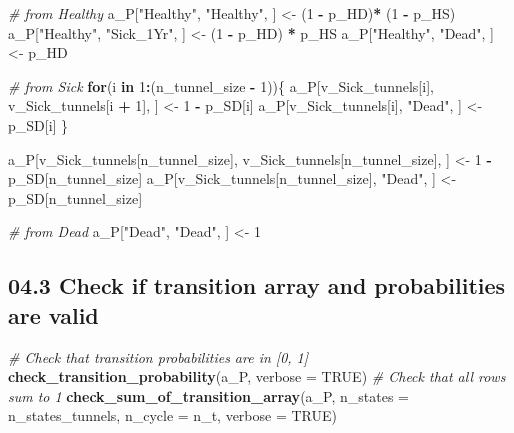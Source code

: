 \documentclass[
]{article}
\newenvironment{Shaded}{\begin{snugshade}}{\end{snugshade}}
\newcommand{\CommentTok}[1]{\textcolor[rgb]{0.56,0.35,0.01}{\textit{#1}}}
\newcommand{\ControlFlowTok}[1]{\textcolor[rgb]{0.13,0.29,0.53}{\textbf{#1}}}
\newcommand{\DataTypeTok}[1]{\textcolor[rgb]{0.13,0.29,0.53}{#1}}
\newcommand{\DecValTok}[1]{\textcolor[rgb]{0.00,0.00,0.81}{#1}}
\newcommand{\KeywordTok}[1]{\textcolor[rgb]{0.13,0.29,0.53}{\textbf{#1}}}
\newcommand{\NormalTok}[1]{#1}
\newcommand{\OperatorTok}[1]{\textcolor[rgb]{0.81,0.36,0.00}{\textbf{#1}}}
\newcommand{\OtherTok}[1]{\textcolor[rgb]{0.56,0.35,0.01}{#1}}
\newcommand{\StringTok}[1]{\textcolor[rgb]{0.31,0.60,0.02}{#1}}
\begin{document}
\begin{Shaded}
\begin{Highlighting}[]
\CommentTok{# from Healthy}
\NormalTok{a_P[}\StringTok{"Healthy"}\NormalTok{, }\StringTok{"Healthy"}\NormalTok{, ]  <-}\StringTok{ }\NormalTok{(}\DecValTok{1} \OperatorTok{-}\StringTok{ }\NormalTok{p_HD)}\OperatorTok{*}\StringTok{ }\NormalTok{(}\DecValTok{1} \OperatorTok{-}\StringTok{ }\NormalTok{p_HS)}
\NormalTok{a_P[}\StringTok{"Healthy"}\NormalTok{, }\StringTok{"Sick_1Yr"}\NormalTok{, ] <-}\StringTok{ }\NormalTok{(}\DecValTok{1} \OperatorTok{-}\StringTok{ }\NormalTok{p_HD) }\OperatorTok{*}\StringTok{ }\NormalTok{p_HS}
\NormalTok{a_P[}\StringTok{"Healthy"}\NormalTok{, }\StringTok{"Dead"}\NormalTok{, ]     <-}\StringTok{ }\NormalTok{p_HD}

\CommentTok{# from Sick}
\ControlFlowTok{for}\NormalTok{(i }\ControlFlowTok{in} \DecValTok{1}\OperatorTok{:}\NormalTok{(n_tunnel_size }\OperatorTok{-}\StringTok{ }\DecValTok{1}\NormalTok{))\{ }
\NormalTok{  a_P[v_Sick_tunnels[i], v_Sick_tunnels[i }\OperatorTok{+}\StringTok{ }\DecValTok{1}\NormalTok{], ] <-}\StringTok{ }\DecValTok{1} \OperatorTok{-}\StringTok{ }\NormalTok{p_SD[i]}
\NormalTok{  a_P[v_Sick_tunnels[i], }\StringTok{"Dead"}\NormalTok{, ] <-}\StringTok{ }\NormalTok{p_SD[i]}
\NormalTok{\}}

\NormalTok{a_P[v_Sick_tunnels[n_tunnel_size], v_Sick_tunnels[n_tunnel_size], ] <-}\StringTok{ }\DecValTok{1} \OperatorTok{-}\StringTok{ }\NormalTok{p_SD[n_tunnel_size]}
\NormalTok{a_P[v_Sick_tunnels[n_tunnel_size], }\StringTok{"Dead"}\NormalTok{, ] <-}\StringTok{ }\NormalTok{p_SD[n_tunnel_size]}

\CommentTok{# from Dead}
\NormalTok{a_P[}\StringTok{"Dead"}\NormalTok{, }\StringTok{"Dead"}\NormalTok{, ] <-}\StringTok{ }\DecValTok{1}
\end{Highlighting}
\end{Shaded}

\hypertarget{check-if-transition-array-and-probabilities-are-valid}{%
\subsection{04.3 Check if transition array and probabilities are
valid}\label{check-if-transition-array-and-probabilities-are-valid}}

\begin{Shaded}
\begin{Highlighting}[]
\CommentTok{# Check that transition probabilities are in [0, 1]}
\KeywordTok{check_transition_probability}\NormalTok{(a_P, }\DataTypeTok{verbose =} \OtherTok{TRUE}\NormalTok{)}
\CommentTok{# Check that all rows sum to 1}
\KeywordTok{check_sum_of_transition_array}\NormalTok{(a_P, }\DataTypeTok{n_states =}\NormalTok{ n_states_tunnels, }\DataTypeTok{n_cycle =}\NormalTok{ n_t, }\DataTypeTok{verbose =} \OtherTok{TRUE}\NormalTok{)}
\end{Highlighting}
\end{Shaded}
\end{document}
